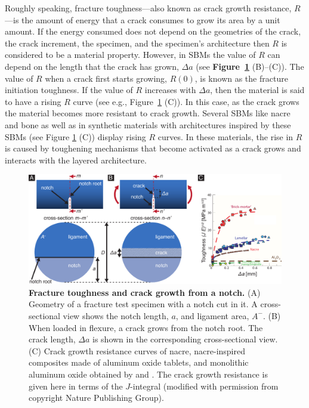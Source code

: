 \documentclass[12pt,onecolumn]{article}
\begin{document}
\begin{bibunit}
Roughly speaking, fracture toughness---also known as crack growth resistance, $R$---is the amount of energy that a crack consumes to grow its area by a unit amount. If the energy consumed does not depend on the geometries of the crack, the crack increment, the specimen, and the specimen's architecture then $R$ is considered to be a material property. However, in SBMs the value of $R$ can depend on the length that the crack has grown, $\Delta a$ (see {\bf Figure~\ref{fig:Rcurve}} (B)--(C)). The value of $R$ when a crack first starts growing, $R(0)$, is known as the fracture initiation toughness. If the value of $R$ increases with $\Delta a$, then the material is said to have a rising $R$ curve (see e.g., Figure~\ref{fig:Rcurve} (C)). 
%
In this case, as the crack grows the material becomes more resistant to crack growth. Several SBMs like nacre and bone  \cite{barthelat2007experimental,rabiei2010failure,nalla2005mechanistic,launey2009mechanistic} as well as in synthetic materials with architectures inspired by these SBMs (see Figure \ref{fig:Rcurve} (C)) \cite{ritchie2011conflicts} display rising $R$ curves. In these materials, the rise in $R$ is caused by toughening mechanisms that become activated as a crack grows and interacts with the layered architecture.
%
			\begin{figure}[ht!]
			\centering
			\includegraphics[width=\textwidth]{../Figures/FigureRcurve/Figure3a_V7.pdf}
			\caption{\textbf{Fracture toughness and crack growth from a notch.} (A) Geometry of a fracture test specimen with a notch cut in it. A cross-sectional view shows the notch length, $a$, and ligament area, $A^-$. (B) When loaded in flexure, a crack grows from the notch root. The crack length, $\Delta a$ is shown in the corresponding cross-sectional view. (C) Crack growth resistance curves of nacre, nacre-inspired composites made of aluminum oxide tablets, and monolithic aluminum oxide obtained by \cite{ritchie2011conflicts} and \cite{munch2008tough}. The crack growth resistance is given here in terms of the $J$-integral (modified with permission from \cite{ritchie2011conflicts} copyright Nature Publishing Group).}
			\label{fig:Rcurve}
			\end{figure}


\end{bibunit}
\end{document}
